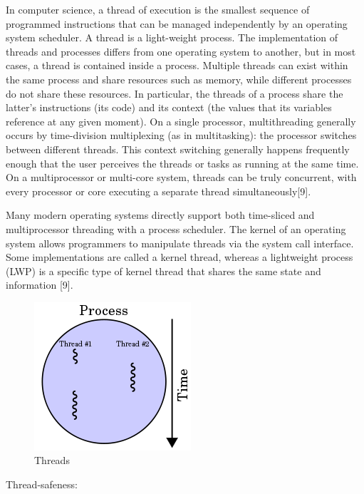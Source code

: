 In computer science, a thread of execution is the smallest sequence of programmed instructions that can be managed independently by an operating system scheduler. A thread is a light-weight process. The implementation of threads and processes differs from one operating system to another, but in most cases, a thread is contained inside a process. Multiple threads can exist within the same process and share resources such as memory, while different processes do not share these resources. In particular, the threads of a process share the latter's instructions (its code) and its context (the values that its variables reference at any given moment).
On a single processor, multithreading generally occurs by time-division multiplexing (as in multitasking): the processor switches between different threads. This context switching generally happens frequently enough that the user perceives the threads or tasks as running at the same time. On a multiprocessor or multi-core system, threads can be truly concurrent, with every processor or core executing a separate thread simultaneously[9].

Many modern operating systems directly support both time-sliced and multiprocessor threading with a process scheduler. The kernel of an operating system allows programmers to manipulate threads via the system call interface. Some implementations are called a kernel thread, whereas a lightweight process (LWP) is a specific type of kernel thread that shares the same state and information [9].
\begin{figure}[H]
\centering
\includegraphics[scale=0.6]{threads.png}
\caption{Threads}
\label{<<Label>>}
\end{figure}

Thread-safeness:

